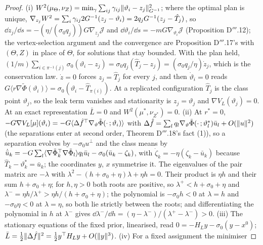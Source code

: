 \begin{proof}
(i) $W^2(\mu_\Theta,\nu_Z) = \min_\gamma\sum_{ij}\gamma_{ij}\lVert \vartheta_i - z_j\rVert^2_{G^{-1}}$; where the optimal plan
is unique, $\nabla_{z_j}W^2 = \sum_i\gamma_{ij}2G^{-1}(z_j - \vartheta_i) = 2q_jG^{-1}(z_j - \hat T_j)$, so
$\dd z_j/\dd s = -(\eta/(\sigma_0q_j))G\nabla_{z_j}\mathcal{J}$ and
$\dd\vartheta_i/\dd s = -mG\nabla_{\vartheta_i}\mathcal{J}$ (Proposition D$'''$.12); the vertex-selection argument and
the convergence are Proposition D$'''$.17's with $(\Theta,Z)$ in place of $\Theta$, for solutions that stay bounded.
With the plan held,
$(1/m)\sum_{i\in\pi^{-1}(j)}\sigma_0(\vartheta_i - z_j) = \sigma_0q_j(\hat T_j - z_j) = (\sigma_0q_j/\eta)\dot z_j$,
which is the conservation law. $\dot z = 0$ forces $z_j = \hat T_j$ for every $j$, and then $\dot\vartheta_i = 0$
reads $G\langle r\nabla\tilde\Phi(\vartheta_i)\rangle = \sigma_0(\vartheta_i - \hat T_{\pi(i)})$. At a replicated
configuration $\hat T_j$ is the class point $\vartheta_j$, so the leak term vanishes and stationarity is
$z_j = \vartheta_j$ and $\nabla V_L(\vartheta_j) = 0$. At an exact representation $\bar L = 0$ and
$W^2(\mu^*,\nu_{Z^*}) = 0$. (ii) At $r^* = 0$,
$-G\nabla V_L[\mu](\vartheta_i) = -G\langle\Delta\hat f^\top\nabla_\vartheta\tilde\Phi(\cdot\,;\vartheta_i)\rangle$ with
$\Delta\hat f = \sum_lq_l\nabla_\vartheta\tilde\Phi(\cdot\,;\vartheta^*_l)\bar u_l + O(\lVert u\rVert^2)$ (the separations
enter at second order, Theorem D$'''$.18's fact (1)), so a separation evolves by $-\sigma_0u^\perp$ and the class
means by $\dot{\bar u}_k = -G\sum_l\langle\nabla\tilde\Phi_k^\top\nabla\tilde\Phi_l\rangle q_l\bar u_l
- \sigma_0(\bar u_k - \zeta_k)$, with $\dot\zeta_k = -\eta(\zeta_k - \bar u_k)$ because
$\hat T_k - \vartheta^*_k = \bar u_k$; the coordinates $y$, $x$ symmetrise it. The eigenvalues of the pair matrix are
$-\lambda$ with $\lambda^2 - (h + \sigma_0 + \eta)\lambda + \eta h = 0$. Their product is $\eta h$ and their sum
$h + \sigma_0 + \eta$; for $h,\eta > 0$ both roots are positive, so $\lambda^+ < h + \sigma_0 + \eta$ and
$\lambda^- = \eta h/\lambda^+ > \eta h/(h + \sigma_0 + \eta)$; the polynomial is $-\sigma_0h < 0$ at $\lambda = h$ and
$-\sigma_0\eta < 0$ at $\lambda = \eta$, so both lie strictly between the roots; and differentiating the polynomial
in $h$ at $\lambda^-$ gives $\dd\lambda^-/\dd h = (\eta - \lambda^-)/(\lambda^+ - \lambda^-) > 0$. (iii) The
stationary equations of the fixed prior, linearised, read $0 = -H_Ly - \sigma_0(y - x^0)$;
$\bar L = \frac12\lVert \Delta\hat f\rVert^2 = \frac12y^\top H_Ly + O(\lVert y\rVert^3)$. (iv) For a fixed assignment the minimiser

\end{proof}

